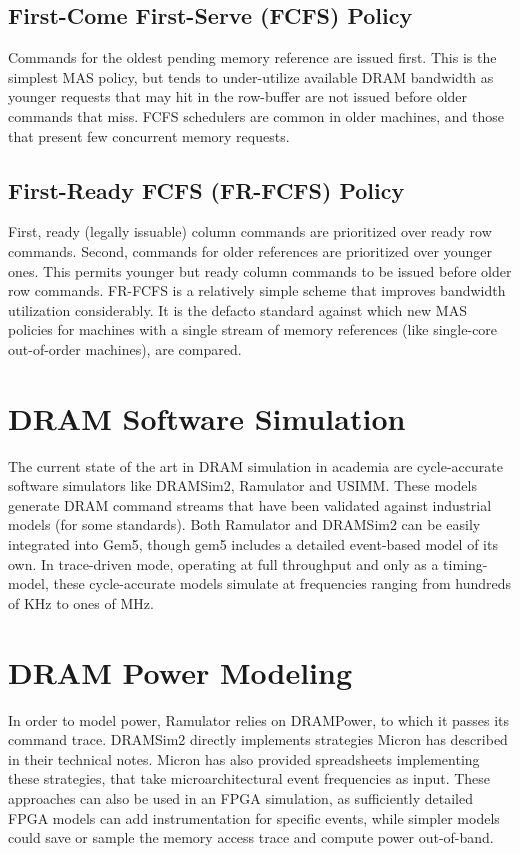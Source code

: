 \subsection{First-Come First-Serve (FCFS) Policy}\label{fcfs} Commands for the
oldest pending memory reference are issued first. This is the simplest MAS
policy, but tends to under-utilize available DRAM bandwidth as younger requests
that may hit in the row-buffer are not issued before older commands that miss.
FCFS schedulers are common in older machines, and those that present few
concurrent memory requests.

\subsection{First-Ready FCFS (FR-FCFS)\cite{frfcfs} Policy}\label{frfcfs}
First, ready (legally issuable) column commands are prioritized over ready row
commands. Second, commands for older references are prioritized over younger
ones. This permits younger but ready column commands to be issued before older
row commands. FR-FCFS is a relatively simple scheme that improves bandwidth
utilization considerably. It is the defacto standard against which new MAS
policies for machines with a single stream of memory references (like
single-core out-of-order machines), are compared.

\section{DRAM Software Simulation}

The current state of the art in DRAM simulation in academia are cycle-accurate
software simulators like DRAMSim2\cite{dramsim}, Ramulator\cite{ramulator} and
USIMM\cite{usimm}. These models generate DRAM command streams that have been
validated against industrial models (for some standards). Both Ramulator and
DRAMSim2 can be easily integrated into Gem5\cite{gem5}, though gem5 includes a
detailed event-based model of its own\cite{gem5event}. In trace-driven mode,
operating at full throughput and only as a timing-model, these cycle-accurate
models simulate at frequencies ranging from hundreds of KHz to ones of
MHz\cite{ramulator}.

\section{DRAM Power Modeling}

In order to model power, Ramulator relies on DRAMPower\cite{drampower}, to
which it passes its command trace. DRAMSim2 directly implements strategies
Micron has described in their technical notes\cite{micronpower}. Micron has
also provided spreadsheets implementing these strategies, that take
microarchitectural event frequencies as input. These approaches can also be
used in an FPGA simulation, as sufficiently detailed FPGA models can add
instrumentation for specific events, while simpler models could save or sample
the memory access trace and compute power out-of-band.
